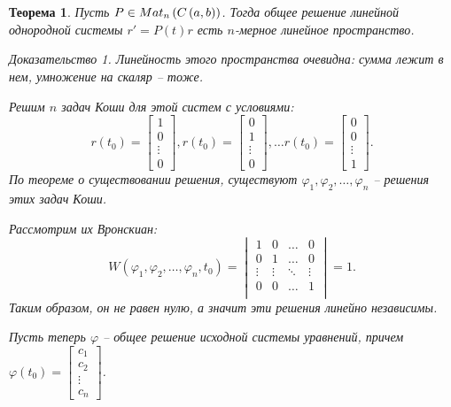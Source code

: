 \documentclass[a5paper, 10pt]{article}
\theoremstyle{definition}
\theoremstyle{plain}
\newtheorem{Th}{Теорема}
\theoremstyle{remark}
\newtheorem*{Proof}{Доказательство}
\begin{document}
	\section{}
	\begin{Th}
		Пусть $P\in Mat_n\left(C\left(a,b\right)\right)$. Тогда общее решение линейной однородной системы $r' = P(t) r$ есть $n$-мерное линейное пространство.
		\begin{Proof}
			Линейность этого пространства очевидна: сумма лежит в нем, умножение на скаляр -- тоже.
			
			Решим $n$ задач Коши для этой систем с условиями: 
			\[
			r(t_0) = \begin{bmatrix}
				1\\0\\\vdots\\0
			\end{bmatrix},
		r(t_0) = \begin{bmatrix}
			0\\1\\\vdots\\0
		\end{bmatrix},\dots r(t_0) = \begin{bmatrix}
		0\\0\\\vdots\\1
	\end{bmatrix}.
			\] 
			По теореме о существовании решения, существуют $\varphi_1, \varphi_2, \dots, \varphi_n$ -- решения этих задач Коши.
			
			Рассмотрим их Вронскиан:
			\[
			W(\varphi_1, \varphi_2, \dots, \varphi_n, t_0) = \begin{vmatrix}
				1 &0 & \dots &0\\
				0&1&\dots &0\\
				\vdots& \vdots&\ddots &\vdots\\
				0&0&\dots &1\\
			\end{vmatrix}=1.
			\]
			Таким образом, он не равен нулю, а значит эти решения линейно независимы. 
			
			Пусть теперь $\varphi$ -- общее решение исходной системы уравнений, причем $\varphi(t_0) = \begin{bmatrix}
				c_1\\c_2\\\vdots\\c_n
			\end{bmatrix}
			$.
			

\end{Proof}
\end{Th}
\end{document}

